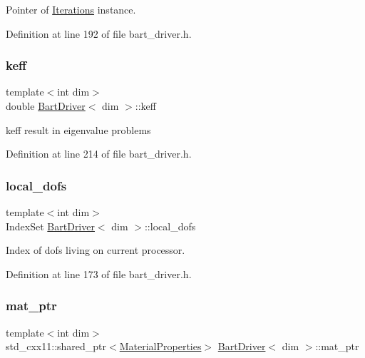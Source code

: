 Pointer of \hyperlink{class_iterations}{Iterations} instance. 



Definition at line 192 of file bart\+\_\+driver.\+h.

\mbox{\label{class_bart_driver_a459fab858171aa05e4618d6d9d327e87}} 
\subsubsection{\texorpdfstring{keff}{keff}}
{\footnotesize\ttfamily template$<$int dim$>$ \\
double \hyperlink{class_bart_driver}{Bart\+Driver}$<$ dim $>$\+::keff\hspace{0.3cm}{\ttfamily [private]}}



keff result in eigenvalue problems 



Definition at line 214 of file bart\+\_\+driver.\+h.

\mbox{\label{class_bart_driver_a06a4f83c6f9bea928ec311fcdf974ab1}} 
\subsubsection{\texorpdfstring{local\+\_\+dofs}{local\_dofs}}
{\footnotesize\ttfamily template$<$int dim$>$ \\
Index\+Set \hyperlink{class_bart_driver}{Bart\+Driver}$<$ dim $>$\+::local\+\_\+dofs\hspace{0.3cm}{\ttfamily [private]}}



Index of dofs living on current processor. 



Definition at line 173 of file bart\+\_\+driver.\+h.

\mbox{\label{class_bart_driver_aef9abac579c212463a6790a0e39e6429}} 
\subsubsection{\texorpdfstring{mat\+\_\+ptr}{mat\_ptr}}
{\footnotesize\ttfamily template$<$int dim$>$ \\
std\+\_\+cxx11\+::shared\+\_\+ptr$<$\hyperlink{class_material_properties}{Material\+Properties}$>$ \hyperlink{class_bart_driver}{Bart\+Driver}$<$ dim $>$\+::mat\+\_\+ptr\hspace{0.3cm}{\ttfamily [private]}}



